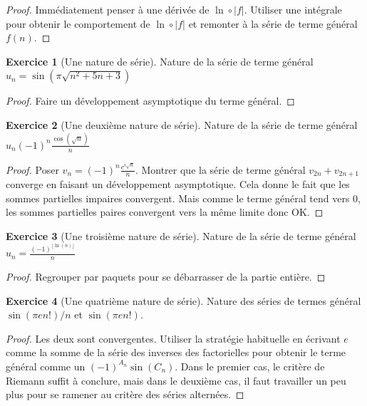 \documentclass[french]{book}
\theoremstyle{definition}
\newtheorem{ex}{Exercice}[chapter]
\theoremstyle{theorem}
\theoremstyle{remark}
\begin{document}
\begin{proof}
	Immédiatement penser à une dérivée de $\ln\circ \lvert f\rvert$. Utiliser une intégrale pour obtenir le comportement de $\ln\circ\lvert f\rvert$ et remonter à la série de terme général $f(n)$.
\end{proof}

\begin{ex}[Une nature de série]
	Nature de la série de terme général $u_n=\sin(\pi\sqrt{n^2+5n+3})$
\end{ex}

\begin{proof}
	Faire un développement asymptotique du terme général.
\end{proof}

\begin{ex}[Une deuxième nature de série]
	Nature de la série de terme général $u_n\displaystyle(-1)^n\frac{\cos(\sqrt{n})}{n}$
\end{ex}

\begin{proof}
	Poser $\displaystyle v_n=(-1)^n\frac{e^{i\sqrt{n}}}{n}$. Montrer que la série de terme général $v_{2n}+v_{2n+1}$ converge en faisant un développement asymptotique. Cela donne le fait que les sommes partielles impaires convergent. Mais comme le terme général tend vers $0$, les sommes partielles paires convergent vers la même limite donc OK.
\end{proof}

\begin{ex}[Une troisième nature de série]
	Nature de la série de terme général $u_n=\displaystyle \frac{(-1)^{\lfloor\ln(n)\rfloor}}{n}$
\end{ex}

\begin{proof}
	Regrouper par paquets pour se débarrasser de la partie entière.
\end{proof}

\begin{ex}[Une quatrième nature de série]
	Nature des séries de termes général $\sin(\pi e n!)/n$ et $\sin(\pi en!)$.
\end{ex}

\begin{proof}
	Les deux sont convergentes. Utiliser la stratégie habituelle en écrivant $e$ comme la somme de la série des inverses des factorielles pour obtenir le terme général comme un $(-1)^{A_n}\sin(C_n)$. Dans le premier cas, le critère de Riemann suffit à conclure, mais dans le deuxième cas, il faut travailler un peu plus pour se ramener au critère des séries alternées.
\end{proof}
\end{document}
